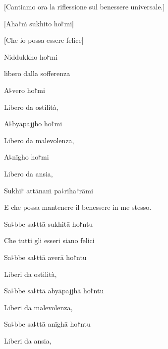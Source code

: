 \begin{english}
[Cantiamo ora la riflessione sul benessere universale.]
\end{english}


[Aha꜓ṁ sukhito ho꜓mi]\\
  \begin{english}
[Che io possa essere felice]
\end{english}

Niddukkho ho꜓mi\\
  \begin{english}
    libero dalla sofferenza
  \end{english}

A꜕vero ho꜓mi\\
  \begin{english}
Libero da ostilità,
  \end{english}

A꜕byāpajjho ho꜓mi\\
  \begin{english} 
    Libero da malevolenza,
  \end{english}

A꜕nīgho ho꜓mi\\
  \begin{english}
Libero da ansia,
  \end{english}

Sukhī꜓ attānaṁ pa꜕riha꜓rāmi

  \begin{english}
E che possa mantenere il benessere in me stesso.
  \end{english}

\clearpage

Sa꜕bbe sa꜕ttā sukhitā ho꜓ntu\\
  \begin{english}
Che tutti gli esseri siano felici
  \end{english}

Sa꜕bbe sa꜕ttā averā ho꜓ntu\\
  \begin{english}
    Liberi da ostilità,
  \end{english}

Sa꜕bbe sa꜕ttā abyāpajjhā ho꜓ntu\\
  \begin{english}
Liberi da malevolenza,
  \end{english} 

Sa꜕bbe sa꜕ttā anīghā ho꜓ntu\\
  \begin{english}
Liberi da ansia,
  \end{english}

